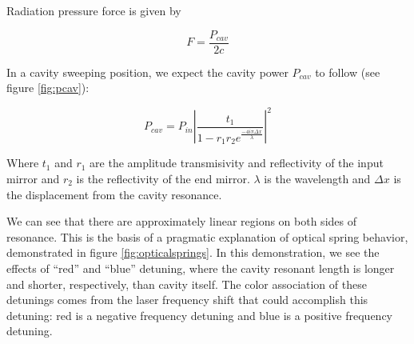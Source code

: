 Radiation pressure force is given by 

\begin{equation}
F=\frac{P_{cav}}{2c}
\label{eq:radpress}
\end{equation}

In a cavity sweeping position, we expect the cavity power $P_{cav}$ to follow (see figure \ref{fig:pcav}):

\begin{equation}
P_{cav} = P_{in} \left| \frac{t_1}{1-r_1 r_2e^\frac{-4i\pi\Delta x}{\lambda}}\right| ^2
\label{eq:pcav}
\end{equation}

Where $t_1$ and $r_1$ are the amplitude transmisivity and reflectivity of the input mirror and $r_2$ is the reflectivity of the end mirror. $\lambda$ is the wavelength and $\Delta x$ is the displacement from the cavity resonance. 

We can see that there are approximately linear regions on both sides of resonance. 
This is the basis of a pragmatic explanation of optical spring behavior, demonstrated in figure \ref{fig:opticalsprings}.
In this demonstration, we see the effects of ``red'' and ``blue'' detuning, where the cavity resonant length is longer and shorter, respectively, than cavity itself. 
The color association of these detunings comes from the laser frequency shift that could accomplish this detuning: red is a negative frequency detuning and blue is a positive frequency detuning. 


